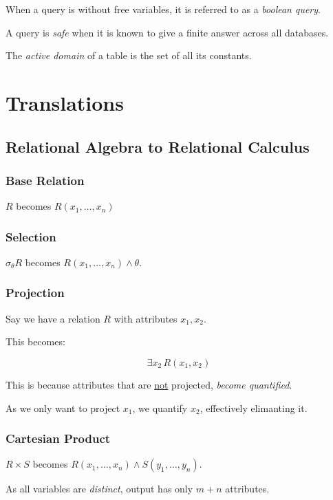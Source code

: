 \documentclass{article}
\begin{document}
When a query is without free variables, it is referred to as a \textit{boolean query}.

A query is \textit{safe} when it is known to give a finite answer across all databases.

The \textit{active domain} of a table is the set of all its constants.

\section{Translations}

\subsection{Relational Algebra to Relational Calculus}

\subsubsection{Base Relation}

$R$ becomes $R(x_1, \ldots, x_n)$

\subsubsection{Selection}

$\sigma_{\theta} R$ becomes $R(x_1, \ldots, x_n) \wedge \theta$.

\subsubsection{Projection}

Say we have a relation $R$ with attributes $x_1, x_2$.

This becomes:

\[ \exists x_2\, R(x_1, x_2)\]

This is because attributes that are \underline{not} projected, \textit{become quantified}.

As we only want to project $x_1$, we quantify $x_2$, effectively elimanting it.

\subsubsection{Cartesian Product}

$R \times S$ becomes $R(x_1, \ldots, x_n) \wedge S(y_1, \ldots, y_n)$.

As all variables are \textit{distinct}, output has only $m + n$ attributes.
\end{document}
